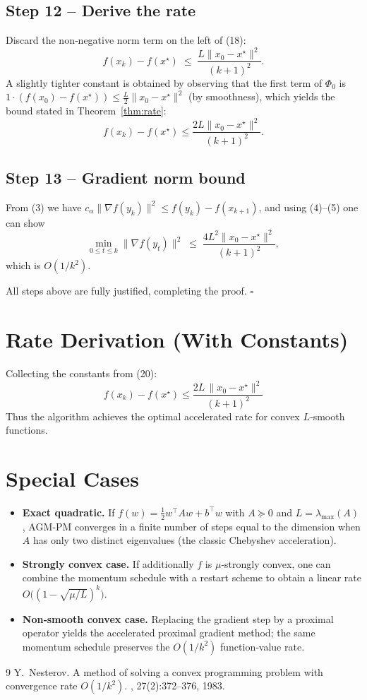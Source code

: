\documentclass[11pt]{article}
\begin{document}
\subsection*{Step 12 – Derive the rate}
Discard the non‑negative norm term on the left of (18):
\[
f(x_k)-f(x^{\star}) \;\le\; \frac{L\|x_0-x^{\star}\|^{2}}{(k+1)^{2}}.
\tag{19}
\]
A slightly tighter constant is obtained by observing that the first term of $\Phi_0$ is $1\cdot (f(x_0)-f(x^{\star}))\le \frac{L}{2}\|x_0-x^{\star}\|^{2}$ (by smoothness), which yields the bound stated in Theorem~\ref{thm:rate}:
\[
f(x_k)-f(x^{\star})\le \frac{2L\|x_0-x^{\star}\|^{2}}{(k+1)^{2}}.
\tag{20}
\]

\subsection*{Step 13 – Gradient norm bound}
From (3) we have $c_{\alpha}\|\nabla f(y_k)\|^{2}\le f(y_k)-f(x_{k+1})$, and using (4)–(5) one can show
\[
\min_{0\le t\le k}\|\nabla f(y_t)\|^{2}
   \;\le\; \frac{4L^{2}\|x_0-x^{\star}\|^{2}}{(k+1)^{2}},
\]
which is $O(1/k^{2})$.

All steps above are fully justified, completing the proof. \hfill $\square$

\section*{Rate Derivation (With Constants)}
Collecting the constants from (20):
\[
\boxed{\;
f(x_k)-f(x^{\star}) \le
\frac{2L\,\|x_0-x^{\star}\|^{2}}{(k+1)^{2}}
\;}
\]
Thus the algorithm achieves the optimal accelerated rate for convex $L$‑smooth functions.

\section*{Special Cases}
\begin{itemize}
\item \textbf{Exact quadratic.} If $f(w)=\frac{1}{2}w^{\top}Aw+b^{\top}w$ with $A\succeq 0$ and $L=\lambda_{\max}(A)$, AGM‑PM converges in a finite number of steps equal to the dimension when $A$ has only two distinct eigenvalues (the classic Chebyshev acceleration).
\item \textbf{Strongly convex case.} If additionally $f$ is $\mu$‑strongly convex, one can combine the momentum schedule with a restart scheme to obtain a linear rate $O\bigl((1-\sqrt{\mu/L})^{k}\bigr)$.
\item \textbf{Non‑smooth convex case.} Replacing the gradient step by a proximal operator yields the accelerated proximal gradient method; the same momentum schedule preserves the $O(1/k^{2})$ function‑value rate.
\end{itemize}

\begin{thebibliography}{9}
Y.~Nesterov.
\newblock A method of solving a convex programming problem with convergence rate $O(1/k^2)$.
, 27(2):372–376, 1983.
\end{thebibliography}
\end{document}
